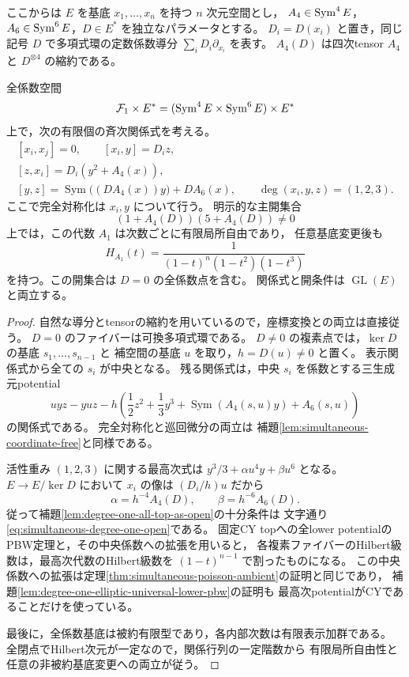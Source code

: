 ここからは $E$ を基底 $x_1,\ldots,x_n$ を持つ $n$ 次元空間とし，
$A_4\in\operatorname{Sym}^4E$，$A_6\in\operatorname{Sym}^6E$，$D\in E^*$ を独立なパラメータとする。
$D_i=D(x_i)$ と置き，同じ記号 $D$ で多項式環の定数係数導分
$\sum_iD_i\partial_{x_i}$ を表す。
$A_4(D)$ は四次tensor $A_4$ と $D^{\otimes4}$ の縮約である。

\begin{theorem}[次数1の全線型方向の有限型平坦ambient族]
\label{thm:simultaneous-degree-one-ambient}
全係数空間
\[
 \mathcal F_1\times E^*
   =(\operatorname{Sym}^4E\times\operatorname{Sym}^6E)\times E^*
\]
上で，次の有限個の斉次関係式を考える。
\begin{equation}\label{eq:simultaneous-degree-one-relations}
 \begin{gathered}
 [x_i,x_j]=0,\qquad [x_i,y]=D_i z,\\
 [z,x_i]=D_i(y^2+A_4(x)),\\
 [y,z]=\operatorname{Sym}\bigl((D A_4(x))y\bigr)+D A_6(x),
 \qquad \deg(x_i,y,z)=(1,2,3).
 \end{gathered}
\end{equation}
ここで完全対称化は $x_i,y$ について行う。
明示的な主開集合
\begin{equation}\label{eq:simultaneous-degree-one-open}
 (1+A_4(D))(5+A_4(D))\ne0
\end{equation}
上では，この代数 $A_1$ は次数ごとに有限局所自由であり，
任意基底変更後も
\[
 H_{A_1}(t)=\frac1{(1-t)^n(1-t^2)(1-t^3)}
\]
を持つ。この開集合は $D=0$ の全係数点を含む。
関係式と開条件は $\operatorname{GL}(E)$ と両立する。
\end{theorem}
\begin{proof}
自然な導分とtensorの縮約を用いているので，座標変換との両立は直接従う。
$D=0$ のファイバーは可換多項式環である。
$D\ne0$ の複素点では，$\ker D$ の基底 $s_1,\ldots,s_{n-1}$ と
補空間の基底 $u$ を取り，$h=D(u)\ne0$ と置く。
表示関係式から全ての $s_i$ が中央となる。
残る関係式は，中央 $s_i$ を係数とする三生成元potential
\[
 uyz-yuz-h\left(\frac12z^2+
       \frac13y^3+\operatorname{Sym}(A_4(s,u)y)+A_6(s,u)\right)
\]
の関係式である。
完全対称化と巡回微分の両立は
補題\ref{lem:simultaneous-coordinate-free}と同様である。

活性重み $(1,2,3)$ に関する最高次式は
$y^3/3+\alpha u^4y+\beta u^6$ となる。
$E\to E/\ker D$ において $x_i$ の像は $(D_i/h)u$ だから
\[
 \alpha=h^{-4}A_4(D),\qquad \beta=h^{-6}A_6(D).
\]
従って補題\ref{lem:degree-one-all-top-as-open}の十分条件は
文字通り\eqref{eq:simultaneous-degree-one-open}である。
固定CY topへの全lower potentialのPBW定理と，その中央係数への拡張を用いると，
各複素ファイバーのHilbert級数は，最高次代数のHilbert級数を
$(1-t)^{n-1}$ で割ったものになる。
この中央係数への拡張は定理\ref{thm:simultaneous-poisson-ambient}の証明と同じであり，
補題\ref{lem:degree-one-elliptic-universal-lower-pbw}の証明も
最高次potentialがCYであることだけを使っている。

最後に，全係数基底は被約有限型であり，各内部次数は有限表示加群である。
全閉点でHilbert次元が一定なので，関係行列の一定階数から
有限局所自由性と任意の非被約基底変更への両立が従う。
\end{proof}

